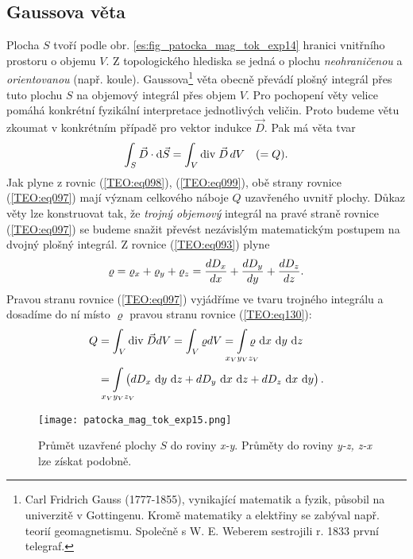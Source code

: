     \subsection{Gaussova věta}
      Plocha \(S\) tvoří podle obr. \ref{es:fig_patocka_mag_tok_exp14} hranici vnitřního prostoru o
      objemu \(V\). Z topologického hlediska se jedná o plochu \emph{neohraničenou} a
      \emph{orientovanou} (např. koule). Gaussova\footnote{Carl Fridrich Gauss (1777-1855),
      vynikající matematik a fyzik, působil na univerzitě v Gottingenu. Kromě matematiky a elektřiny
      se zabýval např. teorií geomagnetismu. Společně s W. E. Weberem sestrojili r. 1833 první
      telegraf.}  věta obecně převádí plošný integrál přes tuto plochu \(S\) na objemový integrál
      přes objem \(V\). Pro pochopení věty velice pomáhá konkrétní fyzikální interpretace
      jednotlivých veličin. Proto budeme větu zkoumat v konkrétním případě pro vektor indukce
      \(\vec{D}\). Pak má věta tvar
      \begin{equation}\label{TEO:eq097}
        \int_S\vec{D}\cdot \mathop{}\!\mathrm{d}\vec{S} = \int_V\mathrm{div}\;\vec{D}\,dV \quad(=Q).
      \end{equation} 
      Jak plyne z rovnic (\ref{TEO:eq098}), (\ref{TEO:eq099}), obě strany rovnice (\ref{TEO:eq097})
      mají význam celkového náboje \(Q\) uzavřeného uvnitř plochy. Důkaz věty lze konstruovat tak,
      že \emph{trojný objemový} integrál na pravé straně rovnice (\ref{TEO:eq097}) se budeme snažit
      převést nezávislým matematickým postupem na dvojný plošný integrál. Z rovnice
      (\ref{TEO:eq093}) plyne
      \begin{equation}\label{TEO:eq130}
        \varrho = \varrho_x + \varrho_y + \varrho_z 
                = \dfrac{d D_x}{d x} + \dfrac{d D_y}{d y} + \dfrac{d D_z}{d z}. 
      \end{equation}
      Pravou stranu rovnice (\ref{TEO:eq097}) vyjádříme ve tvaru trojného integrálu a 
      dosadíme do ní místo \(\varrho\) pravou stranu rovnice (\ref{TEO:eq130}):
      \begin{align}\label{TEO:eq096}
        Q &= \int_V\diver{D}dV = \int_V\varrho dV 
           = \limitint_{\mathclap{x_Vy_Vz_V}}\varrho\,\dd{x}\,\dd{y}\,\dd{z}   \nonumber\\
          &= \limitint_{\mathclap{x_Vy_Vz_V}}\left(dD_x\,\dd{y}\,\dd{z}+dD_y\,\dd{x}\,\dd{z}+dD_z\,\dd{x}\,\dd{y}\right).
      \end{align}      
      \begin{figure}[ht!]
        \centering
        \texttt{[image: patocka\_mag\_tok\_exp15.png]}
        \caption{Průmět uzavřené plochy \(S\) do roviny \emph{x-y}. Průměty do roviny \emph{y-z, 
                 z-x} lze získat podobně.}
        \label{es:fig_patocka_mag_tok_exp15}
      \end{figure}
